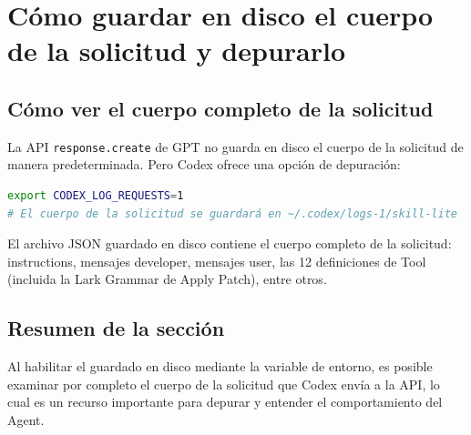\section{Cómo guardar en disco el cuerpo de la solicitud y depurarlo}

\subsection{Cómo ver el cuerpo completo de la solicitud}

La API \texttt{response.create} de GPT no guarda en disco el cuerpo de la solicitud de manera predeterminada. Pero Codex ofrece una opción de depuración:

\begin{lstlisting}[caption={Variable de entorno para habilitar el guardado en disco del cuerpo de la solicitud}, language=bash]
export CODEX_LOG_REQUESTS=1
# El cuerpo de la solicitud se guardará en ~/.codex/logs-1/skill-lite
\end{lstlisting}

El archivo JSON guardado en disco contiene el cuerpo completo de la solicitud: instructions, mensajes developer, mensajes user, las 12 definiciones de Tool (incluida la Lark Grammar de Apply Patch), entre otros.

\subsection{Resumen de la sección}

Al habilitar el guardado en disco mediante la variable de entorno, es posible examinar por completo el cuerpo de la solicitud que Codex envía a la API, lo cual es un recurso importante para depurar y entender el comportamiento del Agent.

